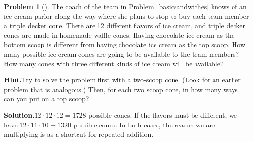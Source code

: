 \documentclass[10pt,]{book}
\theoremstyle{plain}
\theoremstyle{definition}
\newtheorem{activity}[project]{Problem}
\theoremstyle{definition}
\numberwithin{equation}{chapter}
\begin{document}
\begin{activity}[]\label{tripledeckercone}
The coach of the team in \hyperref[basicsandwiches]{Problem~\ref{basicsandwiches}} knows of an ice cream parlor along the way where she plans to stop to buy each team member a triple decker cone. There are 12 different flavors of ice cream, and triple decker cones are made in homemade waffle cones. Having chocolate ice cream as the bottom scoop is different from having chocolate ice cream as the top scoop. How many possible ice cream cones are going to be available to the team members? How many cones with three different kinds of ice cream will be available?%
\par\medskip\noindent%
\textbf{Hint.}\quad Try to solve the problem first with a two-scoop cone. (Look for an earlier problem that is analogous.) Then, for each two scoop cone, in how many ways can you put on a top scoop?%
\par\medskip\noindent%
\textbf{Solution.}\quad \(12\cdot12\cdot12 =1728\) possible cones. If the flavors must be different, we have \(12\cdot11\cdot 10 = 1320\) possible cones. In both cases, the reason we are multiplying is as a shortcut for repeated addition.%
\end{activity}
\end{document}
